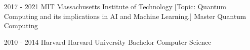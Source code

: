     \begin{sidesection}
   
        \education
            {2017 - 2021}
            {MIT}
            {Massachusetts Institute of Technology}
            [Topic: Quantum Computing and its implications in AI and Machine Learning.]
            {Master}
            {Quantum Computing}

    \vspace{1.4ex}

        \education
            {2010 - 2014}
            {Harvard}
            {Harvard University}
            {Bachelor}
            {Computer Science}

    \end{sidesection}